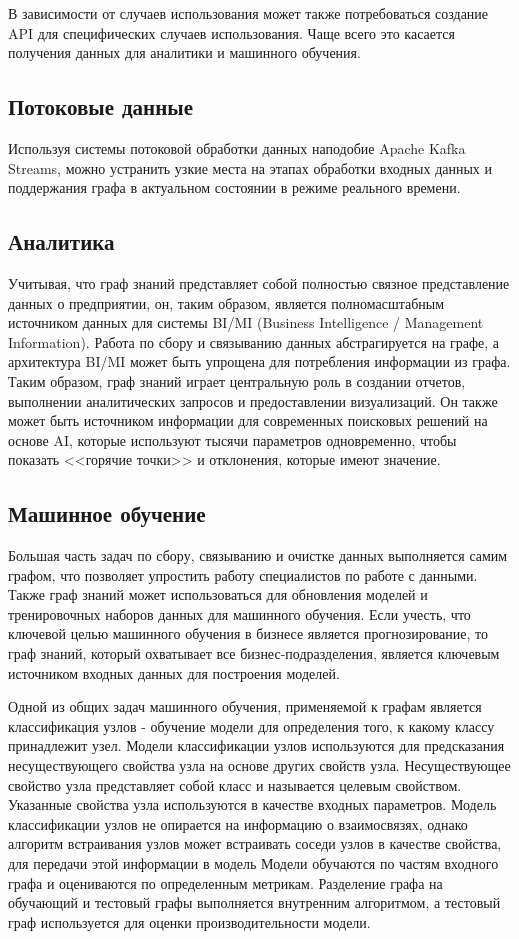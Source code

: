 В зависимости от случаев использования может также потребоваться создание API для специфических случаев использования. Чаще всего это касается
получения данных для аналитики и машинного обучения.

\subsection{Потоковые данные}

Используя системы потоковой обработки данных наподобие Apache Kafka Streams, можно устранить узкие места на этапах обработки входных данных
и поддержания графа в актуальном состоянии в режиме реального времени.

\subsection{Аналитика}

Учитывая, что граф знаний представляет собой полностью связное представление данных о предприятии, он, таким образом, является полномасштабным
источником данных для системы BI/MI (Business Intelligence / Management Information). Работа по сбору и связыванию данных абстрагируется на
графе, а архитектура BI/MI может быть упрощена для потребления информации из графа. Таким образом, граф знаний играет центральную роль в
создании отчетов, выполнении аналитических запросов и предоставлении визуализаций. Он также может быть источником информации для современных
поисковых решений на основе AI, которые используют тысячи параметров одновременно, чтобы показать <<горячие точки>> и отклонения, которые имеют значение.

\subsection{Машинное обучение}

Большая часть задач по сбору, связыванию и очистке данных выполняется самим графом, что позволяет упростить работу специалистов по работе с
данными. Также граф знаний может использоваться для обновления моделей и тренировочных наборов данных для машинного обучения. Если учесть,
что ключевой целью машинного обучения в бизнесе является прогнозирование, то граф знаний, который охватывает все бизнес-подразделения, является
ключевым источником входных данных для построения моделей.

Одной из общих задач машинного обучения, применяемой к графам является классификация узлов - обучение модели для определения того, к какому
классу принадлежит узел. Модели классификации узлов используются для предсказания несуществующего свойства узла на основе других свойств
узла. Несуществующее свойство узла представляет собой класс и называется целевым свойством. Указанные свойства узла используются в качестве
входных параметров. Модель классификации узлов не опирается на информацию о взаимосвязях, однако алгоритм встраивания узлов может встраивать
соседи узлов в качестве свойства, для передачи этой информации в модель Модели обучаются по частям входного графа и оцениваются по
определенным метрикам. Разделение графа на обучающий и тестовый графы выполняется внутренним алгоритмом, а тестовый граф используется для
оценки производительности модели.


